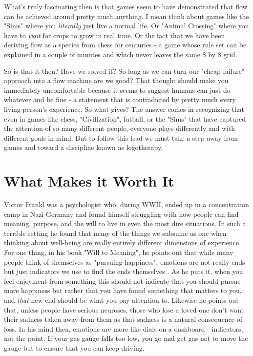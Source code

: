 \documentclass[11pt,a5paper]{book}
\begin{document}
What's truly fascinating then is that games seem to have demonstrated that flow can be achieved around pretty much anything. I mean think about games like the "Sims" where you \textit{literally} just live a normal life. Or "Animal Crossing" where you have to \textit{wait} for crops to grow in real time. Or the fact that we have been deriving flow as a species from chess for centuries - a game whose rule set can be explained in a couple of minutes and which never leaves the same 8 by 8 grid.
\newline

So is that it then? Have we solved it? So long as we can turn our "cheap failure" approach into a flow machine are we good? That thought should make you immediately uncomfortable because it seems to suggest humans can just do whatever and be fine - a statement that is contradicted by pretty much every living person's experience. So what gives? The answer comes in recognizing that even in games like chess, "Civilization", futball, or the "Sims" that have captured the attention of so many different people, everyone plays differently and with different goals in mind. But to follow this lead we must take a step away from games and toward a discipline known as logotherapy.

\section{What Makes it Worth It}
Victor Frankl was a psychologist who, during WWII, ended up in a concentration camp in Nazi Germany and found himself struggling with how people can find meaning, purpose, and the will to live in even the most dire situations. In such a terrible setting he found that many of the things we subsume as one when thinking about well-being are really entirely different dimensions of experience. For one thing, in his book "Will to Meaning", he points out that while many people think of themselves as "pursuing happiness", emotions are not really ends but just indicators we use to find the ends themselves \cite{frankl}. As he puts it, when you feel enjoyment from something this should not indicate that you should pursue more happiness but rather that you have found something that matters to you, and \textit{that} new end should be what you pay attention to. Likewise he points out that, unless people have serious neuroses, those who lose a loved one don't want their sadness taken away from them as that sadness is a natural consequence of loss. In his mind then, emotions are more like dials on a dashboard - indicators, not the point. If your gas gauge falls too low, you go and get gas not to move the gauge but to ensure that you can keep driving. 
\newline
\end{document}

